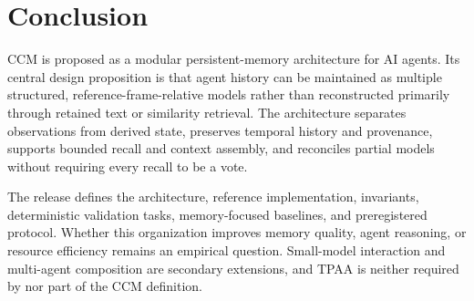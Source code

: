 \section{Conclusion}

CCM is proposed as a modular persistent-memory architecture for AI agents. Its central design proposition is that agent history can be maintained as multiple structured, reference-frame-relative models rather than reconstructed primarily through retained text or similarity retrieval. The architecture separates observations from derived state, preserves temporal history and provenance, supports bounded recall and context assembly, and reconciles partial models without requiring every recall to be a vote.

The \releaseversion{} release defines the architecture, reference implementation, invariants, deterministic validation tasks, memory-focused baselines, and preregistered protocol. Whether this organization improves memory quality, agent reasoning, or resource efficiency remains an empirical question. Small-model interaction and multi-agent composition are secondary extensions, and TPAA is neither required by nor part of the CCM definition.
